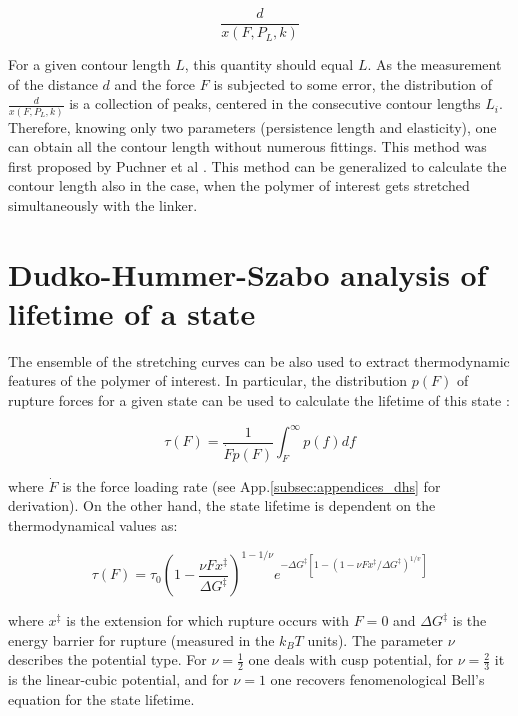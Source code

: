 \begin{equation}
    \boxed{\frac{d}{x(F,P_L,k)}}
\end{equation}

For a given contour length $L$, this quantity should equal $L$.
As the measurement of the distance $d$ and the force $F$ is subjected to some error, the distribution of $\frac{d}{x(F,P_L,k)}$ is a collection of peaks, centered in the consecutive contour lengths $L_i$.
Therefore, knowing only two parameters (persistence length and elasticity), one can obtain all the contour length without numerous fittings.
This method was first proposed by Puchner et al \cite{puchner2008comparing}.
This method can be generalized to calculate the contour length also in the case, when the polymer of interest gets stretched simultaneously with the linker.

\section{Dudko-Hummer-Szabo analysis of lifetime of a state}
\label{sec:theory_dhs}
The ensemble of the stretching curves can be also used to extract thermodynamic features of the polymer of interest.
In particular, the distribution $p(F)$ of rupture forces for a given state can be used to calculate the lifetime of this state \cite{dudko2006intrinsic}:

\begin{equation}
    \boxed{\tau(F) = \frac{1}{\dot{F}p(F)}\int_F^\infty p(f)df}
\end{equation}

where $\dot{F}$ is the force loading rate (see App.\ref{subsec:appendices_dhs} for derivation).
On the other hand, the state lifetime is dependent on the thermodynamical values as:

\begin{equation}
    \boxed{\tau(F) = \tau_0 \left(1-\frac{\nu Fx^\ddagger}{\Delta G^\ddagger}\right)^{1-1/\nu} e^{-\Delta G^\ddagger [1-(1-\nu Fx^\ddagger/\Delta G^\ddagger)^{1/v}]}}
\end{equation}

where $x^\ddagger$ is the extension for which rupture occurs with $F=0$ and $\Delta G^\ddagger$ is the energy barrier for rupture (measured in the $k_BT$ units).
The parameter $\nu$ describes the potential type. For $\nu=\frac{1}{2}$ one deals with cusp potential, for $\nu=\frac{2}{3}$ it is the linear-cubic potential, and for $\nu=1$ one recovers fenomenological Bell's equation for the state lifetime.
